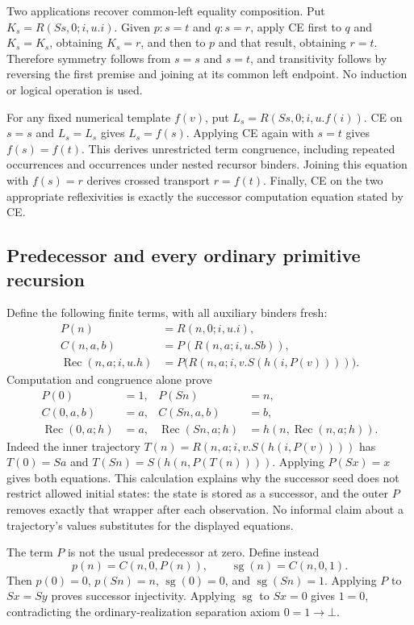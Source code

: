 \documentclass[10pt,letterpaper]{article}
\theoremstyle{definition}
\theoremstyle{remark}
\begin{document}
Two applications recover common-left equality composition. Put
$K_s=R(Ss,0;i,u.i)$. Given $p:s=t$ and $q:s=r$, apply CE first to $q$
and $K_s=K_s$, obtaining $K_s=r$, and then to $p$ and that result,
obtaining $r=t$. Therefore symmetry follows from $s=s$ and $s=t$,
and transitivity follows by reversing the first premise and joining at its
common left endpoint. No induction or logical operation is used.

For any fixed numerical template $f(v)$, put
$L_s=R(Ss,0;i,u.f(i))$. CE on $s=s$ and $L_s=L_s$ gives
$L_s=f(s)$. Applying CE again with $s=t$ gives $f(s)=f(t)$.
This derives unrestricted term congruence, including repeated occurrences
and occurrences under nested recursor binders. Joining this equation with
$f(s)=r$ derives crossed transport $r=f(t)$. Finally, CE on the two
appropriate reflexivities is exactly the successor computation equation stated by CE.

\subsection{Predecessor and every ordinary primitive recursion}

Define the following finite terms, with all auxiliary binders fresh:
\[
\begin{aligned}
 P(n)&=R(n,0;i,u.i),\\
 C(n,a,b)&=P(R(n,a;i,u.Sb)),\\
 \operatorname{Rec}(n,a;i,u.h)
   &=P\bigl(R(n,a;i,v.S(h(i,P(v))))\bigr).
\end{aligned}
\]
Computation and congruence alone prove
\[
\begin{aligned}
 P(0)&=1,& P(Sn)&=n,\\
 C(0,a,b)&=a,& C(Sn,a,b)&=b,\\
 \operatorname{Rec}(0,a;h)&=a,&
 \operatorname{Rec}(Sn,a;h)&=h(n,\operatorname{Rec}(n,a;h)).
\end{aligned}
\tag{Compiler equations}
\]
Indeed the inner trajectory
$T(n)=R(n,a;i,v.S(h(i,P(v))))$ has $T(0)=Sa$ and
$T(Sn)=S(h(n,P(T(n))))$. Applying $P(Sx)=x$ gives both equations.
This calculation explains why the successor seed does not restrict allowed
initial states: the state is stored as a successor, and the outer $P$
removes exactly that wrapper after each observation. No informal claim
about a trajectory's values substitutes for the displayed equations.

The term $P$ is not the usual predecessor at zero. Define instead
\[
 p(n)=C(n,0,P(n)),\qquad \operatorname{sg}(n)=C(n,0,1).
\]
Then $p(0)=0$, $p(Sn)=n$, $\operatorname{sg}(0)=0$, and
$\operatorname{sg}(Sn)=1$. Applying $P$ to $Sx=Sy$ proves
successor injectivity. Applying $\operatorname{sg}$ to $Sx=0$ gives
$1=0$, contradicting the ordinary-realization separation axiom
$0=1\to\bot$.
\end{document}
